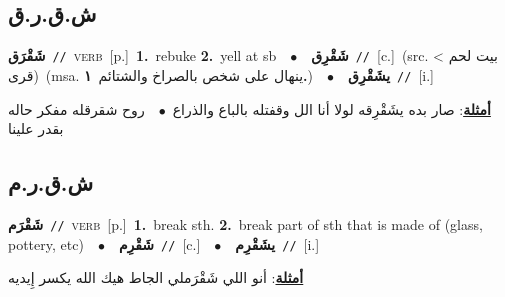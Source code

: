 \documentclass[10pt,a4paper,twoside]{article} %
\begin{document}
\begin{multicols}{2}
\vspace{-3mm}
\subsection*{\color{blue}\foreignlanguage{arabic}{ش.ق.ر.ق}\color{blue}{}} 

{\setlength\topsep{0pt}\textbf{\foreignlanguage{arabic}{شَقْرَق}}\ {\color{gray}\texttt{//}\color{black}}\ \textsc{verb}\ [p.]\ \textbf{1.}~rebuke  \textbf{2.}~yell at sb\ \ $\bullet$\ \ \setlength\topsep{0pt}\textbf{\foreignlanguage{arabic}{شَقْرِق}}\ {\color{gray}\texttt{//}\color{black}}\ [c.]\ (src. \color{gray}\foreignlanguage{arabic}{بيت لحم > قرى}\color{black})\ \color{gray}(msa. \foreignlanguage{arabic}{ينهال على شخص بالصراخ والشتائم}~\foreignlanguage{arabic}{\textbf{١.}})\color{black}\ \ $\bullet$\ \ \setlength\topsep{0pt}\textbf{\foreignlanguage{arabic}{يشَقْرِق}}\ {\color{gray}\texttt{//}\color{black}}\ [i.]\  \begin{flushright}\color{gray}\foreignlanguage{arabic}{\textbf{\underline{\foreignlanguage{arabic}{أمثلة}}}: صار بده يشَقْرِقه لولا أنا الل وقفتله بالباع والذراع\ $\bullet$\ \  روح شقرقله مفكر حاله بقدر علينا}\end{flushright}\color{black}} \vspace{2mm}

\vspace{-3mm}
\subsection*{\color{blue}\foreignlanguage{arabic}{ش.ق.ر.م}\color{blue}{}} 

{\setlength\topsep{0pt}\textbf{\foreignlanguage{arabic}{شَقْرَم}}\ {\color{gray}\texttt{//}\color{black}}\ \textsc{verb}\ [p.]\ \textbf{1.}~break sth.  \textbf{2.}~break part of sth that is made of (glass, pottery, etc)\ \ $\bullet$\ \ \setlength\topsep{0pt}\textbf{\foreignlanguage{arabic}{شَقْرِم}}\ {\color{gray}\texttt{//}\color{black}}\ [c.]\ \ $\bullet$\ \ \setlength\topsep{0pt}\textbf{\foreignlanguage{arabic}{يشَقْرِم}}\ {\color{gray}\texttt{//}\color{black}}\ [i.]\  \begin{flushright}\color{gray}\foreignlanguage{arabic}{\textbf{\underline{\foreignlanguage{arabic}{أمثلة}}}: أنو اللي شَقْرَملي الجاط هيك الله يكسر إِيديه}\end{flushright}\color{black}} \vspace{2mm}


\end{multicols}
\end{document}
